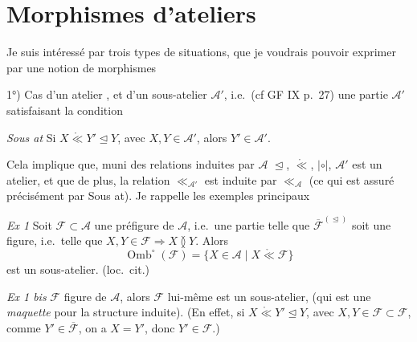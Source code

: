 \documentclass[11pt,a4paper]{article}
\begin{document}

\section*{Morphismes d'ateliers}


\struck{\ill{}} Je suis intéressé par trois types de situations, que je voudrais pouvoir exprimer par une notion de morphismes

1°) Cas d'un atelier , et d'un sous-atelier $\mathcal{A}'$, i.e.\ (cf GF IX p.~27) une partie $\mathcal{A}'$ satisfaisant la condition

\textit{Sous at} Si $X \mathrel{\mathring{\ll}} Y' \trianglelefteq Y$, avec $X, Y \in \mathcal{A}'$, alors $Y' \in \mathcal{A}'$.

Cela implique que, muni des relations induites par $\mathcal{A}$ $\trianglelefteq$, $\mathring{\ll}$, $|{\circ}|$, $\mathcal{A}'$ est un atelier, et que de plus, la relation $\ll_{\mathcal{A}'}$ est induite par $\ll_{\mathcal{A}}$ (ce qui est assuré précisément par Sous at). Je rappelle les exemples principaux

\textit{Ex 1} Soit $\mathcal{F} \subset \mathcal{A}$ une préfigure de $\mathcal{A}$, i.e.\ une partie telle que $\overline{\mathcal{F}}^{(\trianglelefteq)}$ soit une figure, i.e.\ telle que $X, Y \in \mathcal{F} \Rightarrow X \between Y$. Alors
\[
  \operatorname{Omb}^{\circ}(\mathcal{F}) = \{ X \in \mathcal{A} \mid X \mathrel{\mathring{\ll}} \mathcal{F} \}
\]
est un sous-atelier. (loc.\ cit.)

\textit{Ex 1 bis} $\mathcal{F}$ \struck{\ill{}}  figure de $\mathcal{A}$, alors $\mathcal{F}$ lui-même est un sous-atelier, (qui est une \emph{maquette} pour la structure induite). (En effet, si $X \mathrel{\mathring{\ll}} Y' \trianglelefteq Y$, avec $X, Y \in \mathcal{F} \subset \mathcal{F}$, \struck{\ill{}} comme $Y' \in \overline{\mathcal{F}}$, on a $X = Y'$, donc $Y' \in \mathcal{F}$.)
\end{document}
